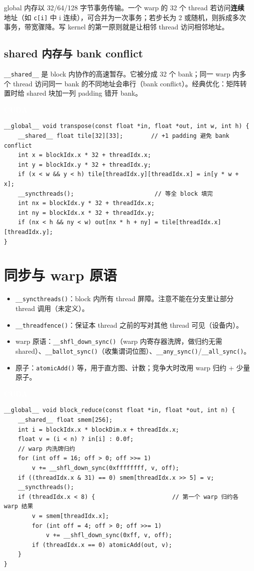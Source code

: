 \documentclass[12pt,a4paper,fontset=fandol]{ctexbook}
\newcommand{\cudalabel}{%
  \begin{tcolorbox}[enhanced,colback=cudaheadbg,colframe=cudaheadbg,
    arc=1mm,boxrule=0mm,left=6pt,right=6pt,top=2pt,bottom=2pt,
    halign=left,oversize]
    \textcolor{white}{\small\bfseries CUDA}
  \end{tcolorbox}\vspace{-4pt}}
\newcommand{\Fn}[1]{\texttt{#1()}}
\begin{document}
global 内存以 32/64/128 字节事务传输。一个 warp 的 32 个 thread 若访问\textbf{连续}地址（如 \texttt{c[i]} 中 i 连续），可合并为一次事务；若步长为 2 或随机，则拆成多次事务，带宽骤降。写 kernel 的第一原则就是让相邻 thread 访问相邻地址。

\subsection{shared 内存与 bank conflict}

\texttt{\_\_shared\_\_} 是 block 内协作的高速暂存。它被分成 32 个 bank；同一 warp 内多个 thread 访问同一 bank 的不同地址会串行（bank conflict）。经典优化：矩阵转置时给 shared 块加一列 padding 错开 bank。

\cudalabel
\begin{lstlisting}[style=cudastyle]
__global__ void transpose(const float *in, float *out, int w, int h) {
    __shared__ float tile[32][33];        // +1 padding 避免 bank conflict
    int x = blockIdx.x * 32 + threadIdx.x;
    int y = blockIdx.y * 32 + threadIdx.y;
    if (x < w && y < h) tile[threadIdx.y][threadIdx.x] = in[y * w + x];
    __syncthreads();                       // 等全 block 填完
    int nx = blockIdx.y * 32 + threadIdx.x;
    int ny = blockIdx.x * 32 + threadIdx.y;
    if (nx < h && ny < w) out[nx * h + ny] = tile[threadIdx.x][threadIdx.y];
}
\end{lstlisting}

\section{同步与 warp 原语}\label{sec:cuda-sync}

\begin{itemize}[nosep]
  \item \Fn{\_\_syncthreads}：block 内所有 thread 屏障。注意不能在分支里让部分 thread 调用（未定义）。
  \item \Fn{\_\_threadfence}：保证本 thread 之前的写对其他 thread 可见（设备内）。
  \item warp 原语：\Fn{\_\_shfl\_down\_sync}（warp 内寄存器洗牌，做归约无需 shared）、\Fn{\_\_ballot\_sync}（收集谓词位图）、\Fn{\_\_any\_sync}/\allowbreak{}\Fn{\_\_all\_sync}。
  \item 原子：\Fn{atomicAdd} 等，用于直方图、计数；竞争大时改用 warp 归约 + 少量原子。
\end{itemize}

\cudalabel
\begin{lstlisting}[style=cudastyle]
__global__ void block_reduce(const float *in, float *out, int n) {
    __shared__ float smem[256];
    int i = blockIdx.x * blockDim.x + threadIdx.x;
    float v = (i < n) ? in[i] : 0.0f;
    // warp 内洗牌归约
    for (int off = 16; off > 0; off >>= 1)
        v += __shfl_down_sync(0xffffffff, v, off);
    if ((threadIdx.x & 31) == 0) smem[threadIdx.x >> 5] = v;
    __syncthreads();
    if (threadIdx.x < 8) {                      // 第一个 warp 归约各 warp 结果
        v = smem[threadIdx.x];
        for (int off = 4; off > 0; off >>= 1)
            v += __shfl_down_sync(0xff, v, off);
        if (threadIdx.x == 0) atomicAdd(out, v);
    }
}
\end{lstlisting}
\end{document}
